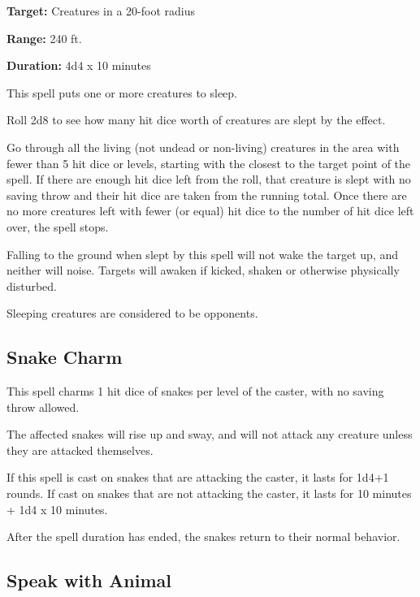 \begin{multicols*}{2}
{\textbf{Target:} Creatures in a 20-foot radius

\textbf{Range:} 240 ft.

\textbf{Duration:} 4d4 x 10 minutes}

This spell puts one or more creatures to sleep.

Roll 2d8 to see how many hit dice worth of creatures are slept by the effect.

Go through all the living (not undead or non-living) creatures in the area with fewer than 5 hit dice or levels, starting with the closest to the target point of the spell. If there are enough hit dice left from the roll, that creature is slept with no saving throw and their hit dice are taken from the running total. Once there are no more creatures left with fewer (or equal) hit dice to the number of hit dice left over, the spell stops.

Falling to the ground when slept by this spell will not wake the target up, and neither will noise. Targets will awaken if kicked, shaken or otherwise physically disturbed.

Sleeping creatures are considered to be  opponents.

\subsection{Snake Charm}\label{spell:Snake Charm}

This spell charms 1 hit dice of snakes per level of the caster, with no saving throw allowed.

The affected snakes will rise up and sway, and will not attack any creature unless they are attacked themselves.

If this spell is cast on snakes that are attacking the caster, it lasts for 1d4+1 rounds. If cast on snakes that are not attacking the caster, it lasts for 10 minutes + 1d4 x 10 minutes.

After the spell duration has ended, the snakes return to their normal behavior.

\subsection{Speak with Animal}\label{spell:Speak with Animal}
\end{multicols*}
